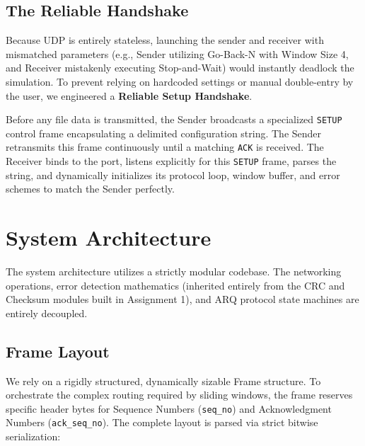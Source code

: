 \documentclass[12pt, a4paper]{article}
\begin{document}
\subsection{The Reliable Handshake}
Because UDP is entirely stateless, launching the sender and receiver with mismatched parameters (e.g., Sender utilizing Go-Back-N with Window Size 4, and Receiver mistakenly executing Stop-and-Wait) would instantly deadlock the simulation. To prevent relying on hardcoded settings or manual double-entry by the user, we engineered a \textbf{Reliable Setup Handshake}. 

Before any file data is transmitted, the Sender broadcasts a specialized \texttt{SETUP} control frame encapsulating a delimited configuration string. The Sender retransmits this frame continuously until a matching \texttt{ACK} is received. The Receiver binds to the port, listens explicitly for this \texttt{SETUP} frame, parses the string, and dynamically initializes its protocol loop, window buffer, and error schemes to match the Sender perfectly.


\section{System Architecture}

The system architecture utilizes a strictly modular codebase. The networking operations, error detection mathematics (inherited entirely from the CRC and Checksum modules built in Assignment 1), and ARQ protocol state machines are entirely decoupled.

\subsection{Frame Layout}
We rely on a rigidly structured, dynamically sizable Frame structure. To orchestrate the complex routing required by sliding windows, the frame reserves specific header bytes for Sequence Numbers (\texttt{seq\_no}) and Acknowledgment Numbers (\texttt{ack\_seq\_no}). The complete layout is parsed via strict bitwise serialization:
\end{document}
